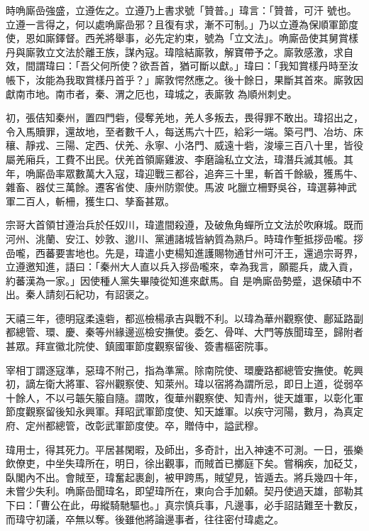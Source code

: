 \begin{pinyinscope}
 時唃廝嵒強盛，立遵佐之。立遵乃上書求號「贊普。」瑋言：「贊普，可汗
 號也。立遵一言得之，何以處唃廝嵒邪？且復有求，漸不可制。」乃以立遵為保順軍節度使，恩如廝鐸督。西羌將舉事，必先定約束，號為「立文法」。唃廝嵒使其舅賞樣丹與廝敦立文法於離王族，謀內寇。瑋陰結廝敦，解寶帶予之。廝敦感激，求自效，間謂瑋曰：「吾父何所使？欲吾首，猶可斷以獻。」瑋曰：「我知賞樣丹時至汝帳下，汝能為我取賞樣丹首乎？」廝敦愕然應之。後十餘日，果斷其首來。廝敦因獻南市地。南市者，秦、渭之厄也，瑋城之，表廝敦
 為順州刺史。



 初，張佶知秦州，置四門砦，侵奪羌地，羌人多叛去，畏得罪不敢出。瑋招出之，令入馬贖罪，還故地，至者數千人，每送馬六十匹，給彩一端。築弓門、冶坊、床穰、靜戎、三陽、定西、伏羌、永寧、小洛門、威遠十砦，浚壕三百八十里，皆役屬羌廂兵，工費不出民。伏羌首領廝雞波、李磨論私立文法，瑋潛兵滅其帳。其年，唃廝嵒率眾數萬大入寇，瑋迎戰三都谷，追奔三十里，斬首千餘級，獲馬牛、雜畜、器仗三萬餘。遷客省使、康州防禦使。馬波
 叱臘立柵野吳谷，瑋選募神武軍二百人，斬柵，獲生口、孳畜甚眾。



 宗哥大首領甘遵治兵於任奴川，瑋遣間殺遵，及破魚角蟬所立文法於吹麻城。既而河州、洮蘭、安江、妙敦、邈川、黨逋諸城皆納質為熟戶。時瑋作塹抵拶嵒嚨。拶嵒嚨，西蕃要害地也。先是，瑋遣小吏楊知進護賜物通甘州可汗王，還過宗哥界，立遵邀知進，語曰：「秦州大人直以兵入拶嵒嚨來，幸為我言，願罷兵，歲入貢，約蕃漢為一家。」因使種人黨失畢陵從知進來獻馬。自
 是唃廝嵒勢蹙，退保磧中不出。秦人請刻石紀功，有詔褒之。



 天禧三年，德明寇柔遠砦，都巡檢楊承吉與戰不利。以瑋為華州觀察使、鄜延路副都總管、環、慶、秦等州緣邊巡檢安撫使。委乞、骨咩、大門等族聞瑋至，歸附者甚眾。拜宣徽北院使、鎮國軍節度觀察留後、簽書樞密院事。



 宰相丁謂逐寇準，惡瑋不附己，指為準黨。除南院使、環慶路都總管安撫使。乾興初，謫左衛大將軍、容州觀察使、知萊州。瑋以宿將為謂所忌，即日上道，從弱卒
 十餘人，不以弓韔矢箙自隨。謂敗，復華州觀察使、知青州，徙天雄軍，以彰化軍節度觀察留後知永興軍。拜昭武軍節度使、知天雄軍。以疾守河陽，數月，為真定府、定州都總管，改彰武軍節度使。卒，贈侍中，謚武穆。



 瑋用士，得其死力。平居甚閑暇，及師出，多奇計，出入神速不可測。一日，張樂飲僚吏，中坐失瑋所在，明日，徐出觀事，而賊首已擲庭下矣。嘗稱疾，加砭艾，臥閣內不出。會賊至，瑋奮起裹創，被甲跨馬，賊望見，皆遁去。將兵幾四十年，
 未嘗少失利。唃廝嵒聞瑋名，即望瑋所在，東向合手加顙。契丹使過天雄，部勒其下曰：「曹公在此，毋縱騎馳驅也。」真宗慎兵事，凡邊事，必手詔詰難至十數反，而瑋守初議，卒無以奪。後雖他將論邊事者，往往密付瑋處之。




\end{pinyinscope}
